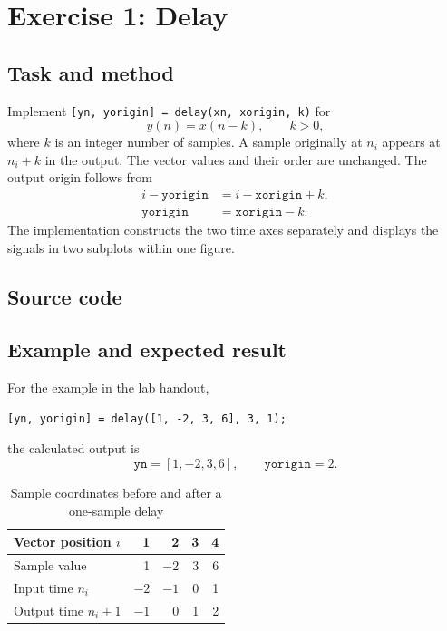 \section{Exercise 1: Delay}
\subsection{Task and method}
Implement \texttt{[yn, yorigin] = delay(xn, xorigin, k)} for
\begin{equation}
  y(n)=x(n-k),\qquad k>0,
\end{equation}
where $k$ is an integer number of samples. A sample originally at $n_i$
appears at $n_i+k$ in the output. The vector values and their order are
unchanged. The output origin follows from
\begin{align}
  i-\texttt{yorigin} &= i-\texttt{xorigin}+k,\\
  \texttt{yorigin} &= \texttt{xorigin}-k.
\end{align}
The implementation constructs the two time axes separately and displays
the signals in two subplots within one figure.

\subsection{Source code}


\subsection{Example and expected result}
For the example in the lab handout,
\begin{lstlisting}[numbers=none]
[yn, yorigin] = delay([1, -2, 3, 6], 3, 1);
\end{lstlisting}
the calculated output is
\[
  \texttt{yn}=[1,-2,3,6],\qquad \texttt{yorigin}=2.
\]
\begin{table}[H]
  \centering
  \caption{Sample coordinates before and after a one-sample delay}
  \label{tab:delay}
  \begin{tabular}{lrrrr}
    \toprule
    Vector position $i$ & 1 & 2 & 3 & 4\\
    \midrule
    Sample value & 1 & $-2$ & 3 & 6\\
    Input time $n_i$ & $-2$ & $-1$ & 0 & 1\\
    Output time $n_i+1$ & $-1$ & 0 & 1 & 2\\
    \bottomrule
  \end{tabular}
\end{table}

